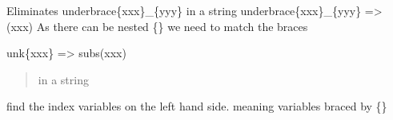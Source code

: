 \documentclass[letterpaper,10pt,english]{sphinxmanual}
\begin{document}

\begin{fulllineitems}
\label{\detokenize{onboard/model_latex:model_latex.debrace}}
\pysigstartsignatures
{}
\pysigstopsignatures
\sphinxAtStartPar
Eliminates  underbrace\{xxx\}\_\{yyy\} in a string
underbrace\{xxx\}\_\{yyy\}  =\textgreater{} (xxx)
As there can be nested \{\} we need to match the braces

\end{fulllineitems}


\begin{fulllineitems}
\label{\detokenize{onboard/model_latex:model_latex.defunk}}
\pysigstartsignatures
{}
\pysigstopsignatures
\sphinxAtStartPar
unk\{xxx\}  =\textgreater{} subs(xxx)
\begin{quote}

\sphinxAtStartPar
in a string
\end{quote}

\end{fulllineitems}


\begin{fulllineitems}
\label{\detokenize{onboard/model_latex:model_latex.findindex}}
\pysigstartsignatures
{}
\pysigstopsignatures
\sphinxAtStartPar
find the index variables on the left hand side. meaning variables braced by \{\}

\end{fulllineitems}

\end{document}
